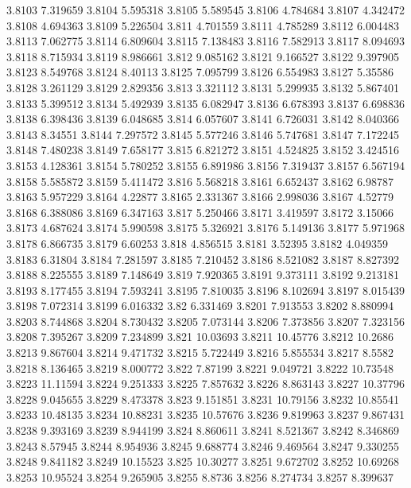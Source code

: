 3.8103  7.319659
3.8104  5.595318
3.8105  5.589545
3.8106  4.784684
3.8107  4.342472
3.8108  4.694363
3.8109  5.226504
3.811  4.701559
3.8111  4.785289
3.8112  6.004483
3.8113  7.062775
3.8114  6.809604
3.8115  7.138483
3.8116  7.582913
3.8117  8.094693
3.8118  8.715934
3.8119  8.986661
3.812  9.085162
3.8121  9.166527
3.8122  9.397905
3.8123  8.549768
3.8124  8.40113
3.8125  7.095799
3.8126  6.554983
3.8127  5.35586
3.8128  3.261129
3.8129  2.829356
3.813  3.321112
3.8131  5.299935
3.8132  5.867401
3.8133  5.399512
3.8134  5.492939
3.8135  6.082947
3.8136  6.678393
3.8137  6.698836
3.8138  6.398436
3.8139  6.048685
3.814  6.057607
3.8141  6.726031
3.8142  8.040366
3.8143  8.34551
3.8144  7.297572
3.8145  5.577246
3.8146  5.747681
3.8147  7.172245
3.8148  7.480238
3.8149  7.658177
3.815  6.821272
3.8151  4.524825
3.8152  3.424516
3.8153  4.128361
3.8154  5.780252
3.8155  6.891986
3.8156  7.319437
3.8157  6.567194
3.8158  5.585872
3.8159  5.411472
3.816  5.568218
3.8161  6.652437
3.8162  6.98787
3.8163  5.957229
3.8164  4.22877
3.8165  2.331367
3.8166  2.998036
3.8167  4.52779
3.8168  6.388086
3.8169  6.347163
3.817  5.250466
3.8171  3.419597
3.8172  3.15066
3.8173  4.687624
3.8174  5.990598
3.8175  5.326921
3.8176  5.149136
3.8177  5.971968
3.8178  6.866735
3.8179  6.60253
3.818  4.856515
3.8181  3.52395
3.8182  4.049359
3.8183  6.31804
3.8184  7.281597
3.8185  7.210452
3.8186  8.521082
3.8187  8.827392
3.8188  8.225555
3.8189  7.148649
3.819  7.920365
3.8191  9.373111
3.8192  9.213181
3.8193  8.177455
3.8194  7.593241
3.8195  7.810035
3.8196  8.102694
3.8197  8.015439
3.8198  7.072314
3.8199  6.016332
3.82  6.331469
3.8201  7.913553
3.8202  8.880994
3.8203  8.744868
3.8204  8.730432
3.8205  7.073144
3.8206  7.373856
3.8207  7.323156
3.8208  7.395267
3.8209  7.234899
3.821  10.03693
3.8211  10.45776
3.8212  10.2686
3.8213  9.867604
3.8214  9.471732
3.8215  5.722449
3.8216  5.855534
3.8217  8.5582
3.8218  8.136465
3.8219  8.000772
3.822  7.87199
3.8221  9.049721
3.8222  10.73548
3.8223  11.11594
3.8224  9.251333
3.8225  7.857632
3.8226  8.863143
3.8227  10.37796
3.8228  9.045655
3.8229  8.473378
3.823  9.151851
3.8231  10.79156
3.8232  10.85541
3.8233  10.48135
3.8234  10.88231
3.8235  10.57676
3.8236  9.819963
3.8237  9.867431
3.8238  9.393169
3.8239  8.944199
3.824  8.860611
3.8241  8.521367
3.8242  8.346869
3.8243  8.57945
3.8244  8.954936
3.8245  9.688774
3.8246  9.469564
3.8247  9.330255
3.8248  9.841182
3.8249  10.15523
3.825  10.30277
3.8251  9.672702
3.8252  10.69268
3.8253  10.95524
3.8254  9.265905
3.8255  8.8736
3.8256  8.274734
3.8257  8.399637
